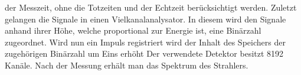 der Messzeit, ohne die Totzeiten und der Echtzeit berücksichtigt werden. Zuletzt gelangen die Signale in einen Vielkanalanalysator. In diesem wird den Signale anhand ihrer Höhe, welche proportional zur Energie ist, eine Binärzahl zugeordnet. Wird nun ein Impuls registriert wird der Inhalt des Speichers der zugehörigen Binärzahl um Eins erhöht Der verwendete Detektor besitzt 8192 Kanäle. Nach der Messung erhält man das Spektrum des Strahlers.